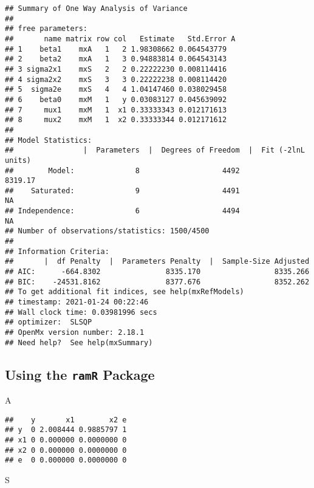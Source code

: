 \documentclass[
]{book}
\newenvironment{Shaded}{\begin{snugshade}}{\end{snugshade}}
\newcommand{\NormalTok}[1]{#1}
\theoremstyle{definition}
\theoremstyle{definition}
\theoremstyle{definition}
\theoremstyle{remark}
\begin{document}
\begin{verbatim}
## Summary of One Way Analysis of Variance 
##  
## free parameters:
##       name matrix row col   Estimate   Std.Error A
## 1    beta1    mxA   1   2 1.98308662 0.064543779  
## 2    beta2    mxA   1   3 0.94883814 0.064543143  
## 3 sigma2x1    mxS   2   2 0.22222230 0.008114416  
## 4 sigma2x2    mxS   3   3 0.22222238 0.008114420  
## 5  sigma2e    mxS   4   4 1.04147460 0.038029458  
## 6    beta0    mxM   1   y 0.03083127 0.045639092  
## 7     mux1    mxM   1  x1 0.33333343 0.012171613  
## 8     mux2    mxM   1  x2 0.33333344 0.012171612  
## 
## Model Statistics: 
##                |  Parameters  |  Degrees of Freedom  |  Fit (-2lnL units)
##        Model:              8                   4492               8319.17
##    Saturated:              9                   4491                    NA
## Independence:              6                   4494                    NA
## Number of observations/statistics: 1500/4500
## 
## Information Criteria: 
##       |  df Penalty  |  Parameters Penalty  |  Sample-Size Adjusted
## AIC:      -664.8302               8335.170                 8335.266
## BIC:    -24531.8162               8377.676                 8352.262
## To get additional fit indices, see help(mxRefModels)
## timestamp: 2021-01-24 00:22:46 
## Wall clock time: 0.03981996 secs 
## optimizer:  SLSQP 
## OpenMx version number: 2.18.1 
## Need help?  See help(mxSummary)
\end{verbatim}

\hypertarget{using-the-ramr-package-3}{%
\subsection{\texorpdfstring{Using the \texttt{ramR} Package}{Using the ramR Package}}\label{using-the-ramr-package-3}}

\begin{Shaded}
\begin{Highlighting}[]
\NormalTok{A}
\end{Highlighting}
\end{Shaded}

\begin{verbatim}
##    y       x1        x2 e
## y  0 2.008444 0.9885797 1
## x1 0 0.000000 0.0000000 0
## x2 0 0.000000 0.0000000 0
## e  0 0.000000 0.0000000 0
\end{verbatim}

\begin{Shaded}
\begin{Highlighting}[]
\NormalTok{S}
\end{Highlighting}
\end{Shaded}
\end{document}
